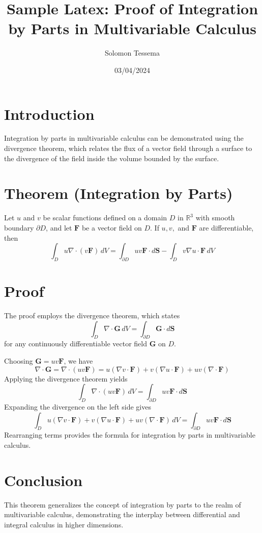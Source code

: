 \documentclass{article}
\begin{document}
\title{Sample Latex: Proof of Integration by Parts in Multivariable Calculus}
\author{Solomon Tessema}
\date{03/04/2024}
\maketitle

\section*{Introduction}
Integration by parts in multivariable calculus can be demonstrated using the divergence theorem, which relates the flux of a vector field through a surface to the divergence of the field inside the volume bounded by the surface.

\section*{Theorem (Integration by Parts)}
Let \(u\) and \(v\) be scalar functions defined on a domain \(D\) in \(\mathbb{R}^3\) with smooth boundary \(\partial D\), and let \(\mathbf{F}\) be a vector field on \(D\). If \(u, v, \) and \(\mathbf{F}\) are differentiable, then
\[
\int_{D} u \nabla \cdot (v\mathbf{F}) \, dV = \int_{\partial D} u v \mathbf{F} \cdot d\mathbf{S} - \int_{D} v \nabla u \cdot \mathbf{F} \, dV
\]

\section*{Proof}
The proof employs the divergence theorem, which states
\[
\int_{D} \nabla \cdot \mathbf{G} \, dV = \int_{\partial D} \mathbf{G} \cdot d\mathbf{S}
\]
for any continuously differentiable vector field \(\mathbf{G}\) on \(D\).

Choosing \(\mathbf{G} = uv\mathbf{F}\), we have
\[
\nabla \cdot \mathbf{G} = \nabla \cdot (uv\mathbf{F}) = u (\nabla v \cdot \mathbf{F}) + v (\nabla u \cdot \mathbf{F}) + uv (\nabla \cdot \mathbf{F})
\]
Applying the divergence theorem yields
\[
\int_{D} \nabla \cdot (uv\mathbf{F}) \, dV = \int_{\partial D} uv\mathbf{F} \cdot d\mathbf{S}
\]
Expanding the divergence on the left side gives
\[
\int_{D} u (\nabla v \cdot \mathbf{F}) + v (\nabla u \cdot \mathbf{F}) + uv (\nabla \cdot \mathbf{F}) \, dV = \int_{\partial D} uv\mathbf{F} \cdot d\mathbf{S}
\]
Rearranging terms provides the formula for integration by parts in multivariable calculus.

\section*{Conclusion}
This theorem generalizes the concept of integration by parts to the realm of multivariable calculus, demonstrating the interplay between differential and integral calculus in higher dimensions.
\end{document}
